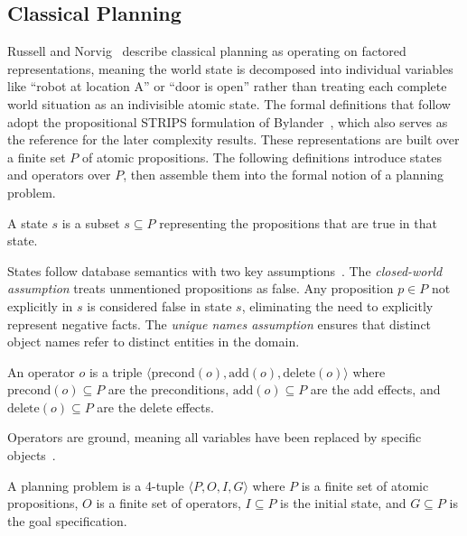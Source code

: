 \subsection{Classical Planning}
\label{sec:foundations_planning}

Russell and Norvig~\cite{Russell2016} describe classical planning as operating on factored representations, meaning the world state is decomposed into individual variables like ``robot at location A'' or ``door is open'' rather than treating each complete world situation as an indivisible atomic state. The formal definitions that follow adopt the propositional \ac{STRIPS} formulation of Bylander~\cite{Bylander1994}, which also serves as the reference for the later complexity results. These representations are built over a finite set $P$ of atomic propositions. The following definitions introduce states and operators over $P$, then assemble them into the formal notion of a planning problem.

\begin{defn}
    \label{defn:state}
    A state $s$ is a subset $s \subseteq P$ representing the propositions that are true in that state.
\end{defn}

States follow database semantics with two key assumptions~\cite{Russell2016,Bylander1994}. The \emph{closed-world assumption} treats unmentioned propositions as false. Any proposition $p \in P$ not explicitly in $s$ is considered false in state $s$, eliminating the need to explicitly represent negative facts. The \emph{unique names assumption} ensures that distinct object names refer to distinct entities in the domain.

\begin{defn}
    \label{defn:operator}
    An operator $o$ is a triple $\langle \text{precond}(o), \text{add}(o), \text{delete}(o) \rangle$ where $\text{precond}(o) \subseteq P$ are the preconditions, $\text{add}(o) \subseteq P$ are the add effects, and $\text{delete}(o) \subseteq P$ are the delete effects.
\end{defn}

Operators are ground, meaning all variables have been replaced by specific objects~\cite{Bylander1994}.

\begin{defn}
    \label{defn:planning_problem}
    A planning problem is a 4-tuple $\langle P, O, I, G \rangle$ where $P$ is a finite set of atomic propositions, $O$ is a finite set of operators, $I \subseteq P$ is the initial state, and $G \subseteq P$ is the goal specification.
\end{defn}

